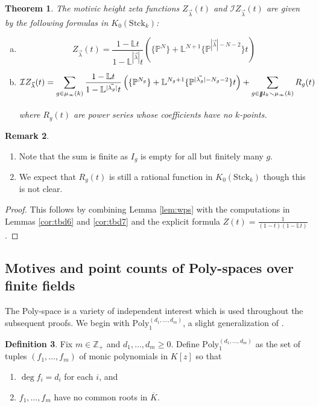 \documentclass[a4paper,12pt]{amsart}
\newtheorem{thm}{Theorem}[section]
\theoremstyle{definition}
\newtheorem{defn}[thm]{Definition}
\newtheorem{rmk}[thm]{Remark}
\newcommand{\bL}{\mathbb{L}}
\newcommand{\bZ}{\mathbb{Z}}
\newcommand{\cI}{\mathcal{I}}
\newcommand{\Bmu}{\mbox{$\raisebox{-0.59ex}
		{$l$}\hspace{-0.18em}\mu\hspace{-0.88em}\raisebox{-0.98ex}{\scalebox{2}
			{$\color{white}.$}}\hspace{-0.416em}\raisebox{+0.88ex}
		{$\color{white}.$}\hspace{0.46em}$}{}}
\newcommand{\Pb}{\mathbb{P}}
\newcommand{\Lb}{\mathbb{L}}
\renewcommand{\setminus}{\smallsetminus}
\begin{document}
	\begin{thm}\label{thm:ratl} The motivic height zeta functions $Z_{\vec{\lambda}}(t)$ and $\cI Z_{\vec{\lambda}}(t)$ are given by the following formulas in $K_0(\mathrm{Stck}_k)$:
		\begin{enumerate}[(a)]
			\item \label{thm:ratla}    
			$$
			Z_{\vec{\lambda}}(t) = 
			\frac{ 1-\Lb t }{1-\Lb^{|\vec{\lambda}|}t} \left( \{\Pb^N\} + \Lb^{N+1}  \{\Pb^{|\vec{\lambda}|-N-2} \} t \right)
			$$
			\item \label{thm:ratlb}    
			$$
			\cI Z_{\vec{\lambda}}(t) = 
			\sum_{g \in \mu_{\infty}(k)} \frac{ 1-\Lb t }{1-\Lb^{|\vec{\lambda_{g}}|}t} \left( \{\Pb^{{N_g}}\} + \Lb^{{N_g}+1}  \{\Pb^{|\vec{\lambda_{g}}| - {N_g} -2} \} t \right) + \sum_{g \in \Bmu_k \setminus \mu_\infty(k)} R_g(t)
			$$
			
			\noindent where $R_g(t)$ are power series whose coefficients have no $k$-points.
		\end{enumerate}
	\end{thm}
	
	\begin{rmk}\begin{enumerate}
			\item Note that the sum is finite as $I_g$ is empty for all but finitely many $g$. 
			\item We expect that $R_g(t)$ is still a rational function in $K_0(\mathrm{Stck}_k)$ though this is not clear. 
		\end{enumerate}
	\end{rmk}
	
	
	\begin{proof} This follows by combining Lemma \ref{lem:wps} with the computations in Lemmas \ref{cor:tbd6} and \ref{cor:tbd7} and the explicit formula $Z(t) = \frac{1}{(1-t)(1- \bL t)}$. 
		
	\end{proof} 
	
	\subsection{Motives and point counts of Poly-spaces over finite fields} \label{subsect:Poly}
	
	The Poly-space is a variety of independent interest which is used throughout the subsequent proofs. We begin with $\mathrm{Poly}_1^{(d_1,\dotsc,d_m)}$, a slight generalization of \cite[Def. 1.1]{FW}.
	
	\begin{defn}\label{def:poly}
		Fix $m \in \bZ_{+}$ and $d_1,\dotsc,d_m \ge 0$. Define $\mathrm{Poly}_1^{(d_1,\dotsc,d_m)}$ as the set of tuples $(f_1,\dotsc,f_m)$ of monic polynomials in $K[z]$ so that
		\begin{enumerate}
			\item $\deg f_i=d_i$ for each $i$, and
			\item $f_1,\dotsc,f_m$ have no common roots in $\overline{K}$.
		\end{enumerate}
	\end{defn}
	
\end{document}
